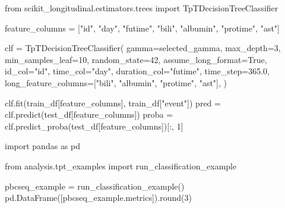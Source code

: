\documentclass[
  letterpaper,
  DIV=11,
  numbers=noendperiod]{scrartcl}
\newenvironment{Shaded}{\begin{snugshade}}{\end{snugshade}}
\newcommand{\BuiltInTok}[1]{\textcolor[rgb]{0.00,0.23,0.31}{#1}}
\newcommand{\DecValTok}[1]{\textcolor[rgb]{0.68,0.00,0.00}{#1}}
\newcommand{\FloatTok}[1]{\textcolor[rgb]{0.68,0.00,0.00}{#1}}
\newcommand{\ImportTok}[1]{\textcolor[rgb]{0.00,0.46,0.62}{#1}}
\newcommand{\NormalTok}[1]{\textcolor[rgb]{0.00,0.23,0.31}{#1}}
\newcommand{\OperatorTok}[1]{\textcolor[rgb]{0.37,0.37,0.37}{#1}}
\newcommand{\StringTok}[1]{\textcolor[rgb]{0.13,0.47,0.30}{#1}}
\newcommand{\VariableTok}[1]{\textcolor[rgb]{0.07,0.07,0.07}{#1}}
\begin{document}
\begin{Shaded}
\begin{Highlighting}[]
\ImportTok{from}\NormalTok{ scikit\_longitudinal.estimators.trees }\ImportTok{import}\NormalTok{ TpTDecisionTreeClassifier}

\NormalTok{feature\_columns }\OperatorTok{=}\NormalTok{ [}\StringTok{"id"}\NormalTok{, }\StringTok{"day"}\NormalTok{, }\StringTok{"futime"}\NormalTok{, }\StringTok{"bili"}\NormalTok{, }\StringTok{"albumin"}\NormalTok{, }\StringTok{"protime"}\NormalTok{, }\StringTok{"ast"}\NormalTok{]}

\NormalTok{clf }\OperatorTok{=}\NormalTok{ TpTDecisionTreeClassifier(}
\NormalTok{    gamma}\OperatorTok{=}\NormalTok{selected\_gamma,}
\NormalTok{    max\_depth}\OperatorTok{=}\DecValTok{3}\NormalTok{,}
\NormalTok{    min\_samples\_leaf}\OperatorTok{=}\DecValTok{10}\NormalTok{,}
\NormalTok{    random\_state}\OperatorTok{=}\DecValTok{42}\NormalTok{,}
\NormalTok{    assume\_long\_format}\OperatorTok{=}\VariableTok{True}\NormalTok{,}
\NormalTok{    id\_col}\OperatorTok{=}\StringTok{"id"}\NormalTok{,}
\NormalTok{    time\_col}\OperatorTok{=}\StringTok{"day"}\NormalTok{,}
\NormalTok{    duration\_col}\OperatorTok{=}\StringTok{"futime"}\NormalTok{,}
\NormalTok{    time\_step}\OperatorTok{=}\FloatTok{365.0}\NormalTok{,}
\NormalTok{    long\_feature\_columns}\OperatorTok{=}\NormalTok{[}\StringTok{"bili"}\NormalTok{, }\StringTok{"albumin"}\NormalTok{, }\StringTok{"protime"}\NormalTok{, }\StringTok{"ast"}\NormalTok{],}
\NormalTok{)}

\NormalTok{clf.fit(train\_df[feature\_columns], train\_df[}\StringTok{"event"}\NormalTok{])}
\NormalTok{pred }\OperatorTok{=}\NormalTok{ clf.predict(test\_df[feature\_columns])}
\NormalTok{proba }\OperatorTok{=}\NormalTok{ clf.predict\_proba(test\_df[feature\_columns])[:, }\DecValTok{1}\NormalTok{]}
\end{Highlighting}
\end{Shaded}

\begin{Shaded}
\begin{Highlighting}[]
\ImportTok{import}\NormalTok{ pandas }\ImportTok{as}\NormalTok{ pd}

\ImportTok{from}\NormalTok{ analysis.tpt\_examples }\ImportTok{import}\NormalTok{ run\_classification\_example}

\NormalTok{pbcseq\_example }\OperatorTok{=}\NormalTok{ run\_classification\_example()}
\NormalTok{pd.DataFrame([pbcseq\_example.metrics]).}\BuiltInTok{round}\NormalTok{(}\DecValTok{3}\NormalTok{)}
\end{Highlighting}
\end{Shaded}
\end{document}
